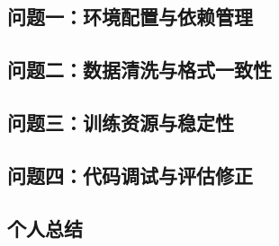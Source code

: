 \documentclass[a4paper,12pt]{ctexart}
\begin{document}
\subsection{问题一：环境配置与依赖管理}


\subsection{问题二：数据清洗与格式一致性}


\subsection{问题三：训练资源与稳定性}


\subsection{问题四：代码调试与评估修正}


\subsection{个人总结}

\end{document}
